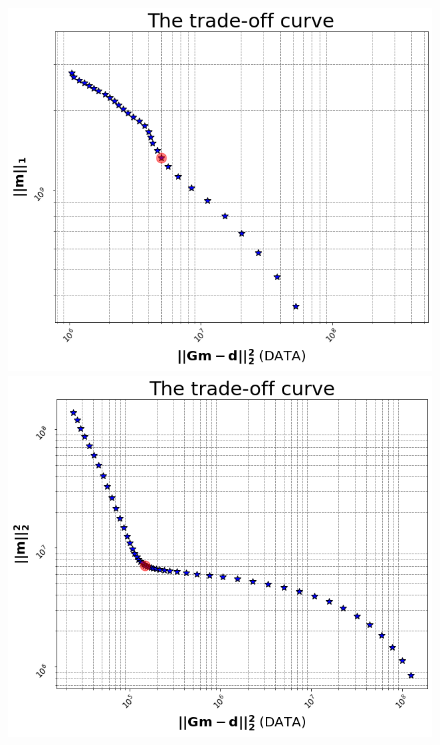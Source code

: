 \documentclass{article}
\begin{document}
\begin{figure}[!htb]
   \begin{minipage}{0.33\textwidth}
     \centering
     \includegraphics[width=.95\linewidth]{figures/LASSO_Trade_Off_100_Zoomed_In_USING.png}
     \subfloat[1a]
   \end{minipage}\hfill
   \begin{minipage}{0.33\textwidth}
     \centering
     \includegraphics[width=.95\linewidth]{figures/Ridge_Trade_Off_USING.png}
     \subfloat[1b]

\end{minipage}
\end{figure}
\end{document}
